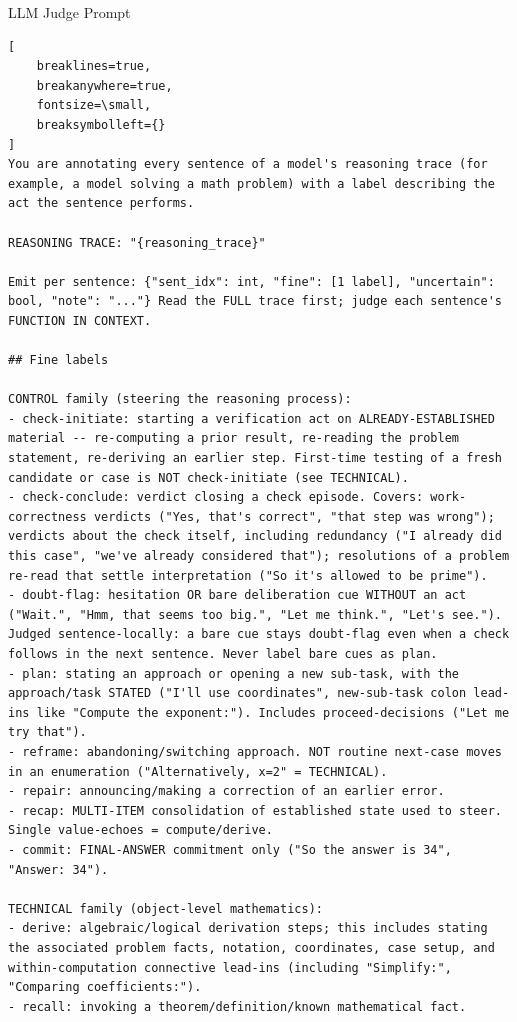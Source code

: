 \begin{promptbox}{LLM Judge Prompt}
\begin{Verbatim}[
    breaklines=true,
    breakanywhere=true,
    fontsize=\small,
    breaksymbolleft={}
]
You are annotating every sentence of a model's reasoning trace (for example, a model solving a math problem) with a label describing the act the sentence performs.

REASONING TRACE: "{reasoning_trace}"

Emit per sentence: {"sent_idx": int, "fine": [1 label], "uncertain": bool, "note": "..."} Read the FULL trace first; judge each sentence's FUNCTION IN CONTEXT.

## Fine labels

CONTROL family (steering the reasoning process):
- check-initiate: starting a verification act on ALREADY-ESTABLISHED material -- re-computing a prior result, re-reading the problem statement, re-deriving an earlier step. First-time testing of a fresh candidate or case is NOT check-initiate (see TECHNICAL).
- check-conclude: verdict closing a check episode. Covers: work-correctness verdicts ("Yes, that's correct", "that step was wrong"); verdicts about the check itself, including redundancy ("I already did this case", "we've already considered that"); resolutions of a problem re-read that settle interpretation ("So it's allowed to be prime").
- doubt-flag: hesitation OR bare deliberation cue WITHOUT an act ("Wait.", "Hmm, that seems too big.", "Let me think.", "Let's see."). Judged sentence-locally: a bare cue stays doubt-flag even when a check follows in the next sentence. Never label bare cues as plan.
- plan: stating an approach or opening a new sub-task, with the approach/task STATED ("I'll use coordinates", new-sub-task colon lead-ins like "Compute the exponent:"). Includes proceed-decisions ("Let me try that").
- reframe: abandoning/switching approach. NOT routine next-case moves in an enumeration ("Alternatively, x=2" = TECHNICAL).
- repair: announcing/making a correction of an earlier error.
- recap: MULTI-ITEM consolidation of established state used to steer. Single value-echoes = compute/derive.
- commit: FINAL-ANSWER commitment only ("So the answer is 34", "Answer: 34").

TECHNICAL family (object-level mathematics):
- derive: algebraic/logical derivation steps; this includes stating the associated problem facts, notation, coordinates, case setup, and within-computation connective lead-ins (including "Simplify:", "Comparing coefficients:").
- recall: invoking a theorem/definition/known mathematical fact.


\end{Verbatim}
\end{promptbox}
